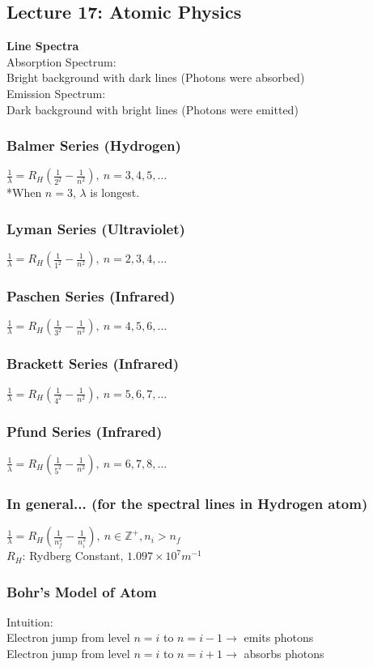 \documentclass[10 pt]{article}
\begin{document}
\begin{multicols}{2}
\subsection*{Lecture 17: Atomic Physics}
\textbf{Line Spectra} \\
Absorption Spectrum: \\
Bright background with dark lines (Photons were absorbed) \\
Emission Spectrum: \\
Dark background with bright lines (Photons were emitted)
\subsubsection*{Balmer Series (Hydrogen)}
$\frac{1}{\lambda} = R_H (\frac{1}{2^2} - \frac{1}{n^2}), ~n=3,4,5,\ldots$ \\
*When $n=3$, $\lambda$ is longest.
\subsubsection*{Lyman Series (Ultraviolet)}
$\frac{1}{\lambda} = R_H (\frac{1}{1^2} - \frac{1}{n^2}), ~n=2,3,4,\ldots$
\subsubsection*{Paschen Series (Infrared)}
$\frac{1}{\lambda} = R_H (\frac{1}{3^2} - \frac{1}{n^2}), ~n=4,5,6,\ldots$
\subsubsection*{Brackett Series (Infrared)}
$\frac{1}{\lambda} = R_H (\frac{1}{4^2} - \frac{1}{n^2}), ~n=5,6,7,\ldots$
\subsubsection*{Pfund Series (Infrared)}
$\frac{1}{\lambda} = R_H (\frac{1}{5^2} - \frac{1}{n^2}), ~n=6,7,8,\ldots$
\subsubsection*{In general... (for the spectral lines in Hydrogen atom)}
$\frac{1}{\lambda} = R_H (\frac{1}{n_f^2} - \frac{1}{n_i^2}), ~n\in \mathbb{Z}^+,n_i > n_f$ \\
$R_H$: Rydberg Constant, $1.097 \times 10^7 m^{-1}$
\subsubsection*{Bohr's Model of Atom}
Intuition: \\
Electron jump from level $n=i$ to $n=i-1 \rightarrow$ emits photons \\
Electron jump from level $n=i$ to $n=i+1 \rightarrow$ absorbs photons

\end{multicols}
\end{document}
